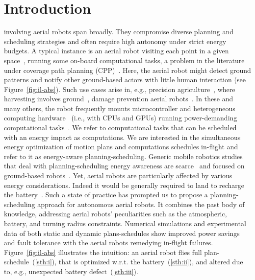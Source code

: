 \documentclass[letterpaper,10pt,journal,twoside]{IEEEtran}
\theoremstyle{definition}
\begin{document}
%
\IEEEpeerreviewmaketitle


\section{Introduction}  %
\label{sec:intro}       %
 involving aerial robots span broadly. They compromise diverse planning and scheduling strategies and often require high autonomy under strict energy budgets. A typical instance is an aerial robot visiting each point in a given space~\cite{cabreira2019survey}, running some on-board computational tasks, a problem in the literature under coverage path planning (CPP)~\cite{choset2001coverage,galceran2013survey}. Here, the aerial robot might detect ground patterns and notify other ground-based actors with little human interaction (see Figure~\ref{fig:il-abs}). Such use cases arise in, e.g., precision agriculture~\cite{hajjaj2014review}, where harvesting involves ground~\cite{qingchun2012study,dong2011development, de2011design, aljanobi2010setup, li2008analysis, edan2000robotic}, damage prevention aerial robots~\cite{puri2017agriculture, daponte2019review}. In these and many others, the robot frequently mounts microcontroller and heterogeneous computing hardware~\cite{mei2005case} (i.e., with CPUs and GPUs) running power-demanding computational tasks~\cite{william2019aerial, peng2019evaluating,wang2020yolo,alexey2021autonomous}. We refer to computational tasks that can be scheduled with an energy impact as computations. We are interested in the simultaneous energy optimization of motion plans and computations schedules in-flight and refer to it as energy-aware planning-scheduling. Generic mobile robotics studies that deal with planning-scheduling energy awareness are scarce~\cite{brateman2006energy,sudhakar2020balancing,lahijanian2018resource,ondruska2015scheduled} and focused on ground-based robots~\cite{mei2005case,sadrpour2013mission,lahijanian2018resource,ondruska2015scheduled,ho2019learning}. Yet, aerial robots are particularly affected by various energy considerations. Indeed it would be generally required to land to recharge the battery~\cite{zamanakos2020energy}. Such a state of practice has prompted us to propose a planning-scheduling approach for autonomous aerial robots. It combines the past body of knowledge, addressing aerial robots' peculiarities such as the atmospheric, battery, and turning radius constraints. Numerical simulations and experimental data of both static and dynamic plans-schedules show improved power savings and fault tolerance with the aerial robots remedying in-flight failures. Figure~\ref{fig:il-abs} illustrates the intuition: an aerial robot flies full plan-schedule~(\ref{sth:i}), that is optimized w.r.t. the battery~(\ref{sth:ii}), and altered due to, e.g., unexpected battery defect~(\ref{sth:iii}).
\end{document}
